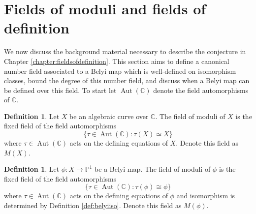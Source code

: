\documentclass{dcthesis}
\newcommand{\PP}{\mathbb P}
\newcommand{\CC}{\mathbb C}
\newcommand{\defi}[1]{\textsf{#1}}
\DeclareMathOperator{\Aut}{Aut}
\numberwithin{equation}{section}
\theoremstyle{definition}
\newtheorem{definition}[equation]{Definition}
\theoremstyle{remark}
\begin{document}
{{  \section{Fields of moduli and fields of definition}{\label{sec:fieldsofmodulifieldsofdefinition}
    We now discuss the background
    material necessary to describe
    the conjecture in
    Chapter \ref{chapter:fieldsofdefinition}.
    This section aims
    to define a canonical number field
    associated to a Belyi map
    which is well-defined on isomorphism classes,
    bound the degree of this number field,
    and discuss when a Belyi map can be defined
    over this field.
    To start let $\Aut(\CC)$ denote the
    field automorphisms of $\CC$.
    \begin{definition}
      \label{def:fieldofmoduli}
      Let $X$ be an algebraic curve over $\CC$.
      The \defi{field of moduli} of
      $X$ is the fixed field of the
      field automorphisms
      \begin{equation}
        \label{eqn:fixedfield}
        \{\tau\in\Aut(\CC) : \tau(X)\simeq X\}
      \end{equation}
      where $\tau\in\Aut(\CC)$ acts on
      the defining equations of $X$.
      Denote this field as $M(X)$.
    \end{definition}
    \begin{definition}
      \label{def:fieldofmodulibelyimap}
      Let $\phi\colon X\to\PP^1$ be a Belyi map.
      The \defi{field of moduli} of $\phi$
      is the fixed field of the
      field automorphisms
      \begin{equation}
        \label{eqn:fixedfieldphi}
        \{\tau\in\Aut(\CC) : \tau(\phi)\cong \phi\}
      \end{equation}
      where $\tau\in\Aut(\CC)$ acts on the
      defining equations of $\phi$
      and isomorphism is determined by
      Definition \ref{def:belyiiso}.
      Denote this field as $M(\phi)$.
    \end{definition}
}}}
\end{document}
